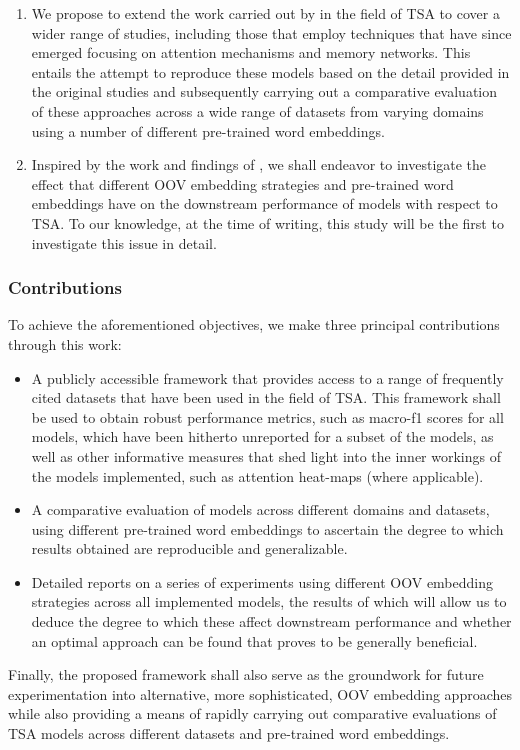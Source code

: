 \documentclass[../../fyp.tex]{subfiles}
\begin{document}
\begin{enumerate}
	\item We propose to extend the work carried out by \citet{moore2018} in the field of TSA to cover a wider range of studies, including those that employ techniques that have since emerged focusing on attention mechanisms and memory networks. This entails the attempt to reproduce these models based on the detail provided in the original studies and subsequently carrying out a comparative evaluation of these approaches across a wide range of datasets from varying domains using a number of different pre-trained word embeddings.
	\item Inspired by the work and findings of \citet{bhuwandhingra2017}, we shall endeavor to investigate the effect that different OOV embedding strategies and pre-trained word embeddings have on the downstream performance of models with respect to TSA. To our knowledge, at the time of writing, this study will be the first to investigate this issue in detail.
\end{enumerate}

\subsubsection{Contributions}

To achieve the aforementioned objectives, we make three principal contributions through this work:
\begin{itemize}
	\item A publicly accessible framework that provides access to a range of frequently cited datasets that have been used in the field of TSA. This framework shall be used to obtain robust performance metrics, such as macro-f1 scores for all models, which have been hitherto unreported for a subset of the models, as well as other informative measures that shed light into the inner workings of the models implemented, such as attention heat-maps (where applicable).
	\item A comparative evaluation of models across different domains and datasets, using different pre-trained word embeddings to ascertain the degree to which results obtained are reproducible and generalizable.
	\item Detailed reports on a series of experiments using different OOV embedding strategies across all implemented models, the results of which will allow us to deduce the degree to which these affect downstream performance and whether an optimal approach can be found that proves to be generally beneficial.
\end{itemize}

Finally, the proposed framework shall also serve as the groundwork for future experimentation into alternative, more sophisticated, OOV embedding approaches while also providing a means of rapidly carrying out comparative evaluations of TSA models across different datasets and pre-trained word embeddings.
\end{document}
